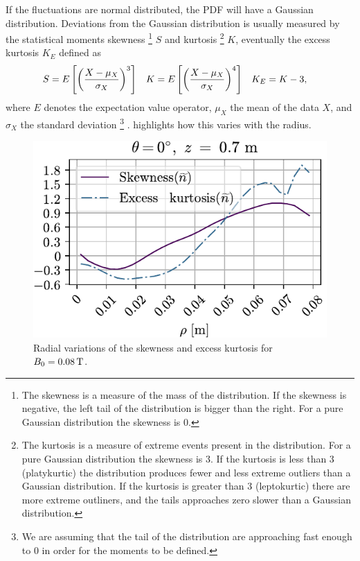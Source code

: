 If the fluctuations are normal distributed, the PDF will have a Gaussian distribution.
Deviations from the Gaussian distribution is usually measured by the statistical moments skewness%
%
\footnote{
    The skewness is a measure of the mass of the distribution.
    If the skewness is negative, the left tail of the distribution is bigger than the right.
    For a pure Gaussian distribution the skewness is 0.
}
%
$S$ and kurtosis%
%
\footnote{
    The kurtosis is a measure of extreme events present in the distribution.
    For a pure Gaussian distribution the skewness is 3.
    If the kurtosis is less than 3 (platykurtic) the distribution produces fewer and less extreme outliers than a Gaussian distribution.
    If the kurtosis is greater than 3 (leptokurtic) there are more extreme outliners, and the tails approaches zero slower than a Gaussian distribution.
}
%
$K$, eventually the excess kurtosis $K_E$ defined as
%
\begin{align*}
    &S=E\left[\left(\frac{X - \mu_X}{\sigma_X}\right)^3\right]&
    &K=E\left[\left(\frac{X - \mu_X}{\sigma_X}\right)^4\right]&
    &K_E=K-3,
\end{align*}
%
where $E$ denotes the expectation value operator, $\mu_X$ the mean of the data $X$, and $\sigma_X$ the standard deviation%
\footnote{We are assuming that the tail of the distribution are approaching fast enough to $0$ in order for the moments to be defined.}%
.
 highlights how this varies with the radius.
%
\begin{figure}[htb]
    \centering
    \includegraphics{fig/results/skewKurt/008T}
    \caption{Radial variations of the skewness and excess kurtosis for $B_0 = 0.08\, \text{T}$.}
    \label{fig:skewKurt008}
\end{figure}
%

